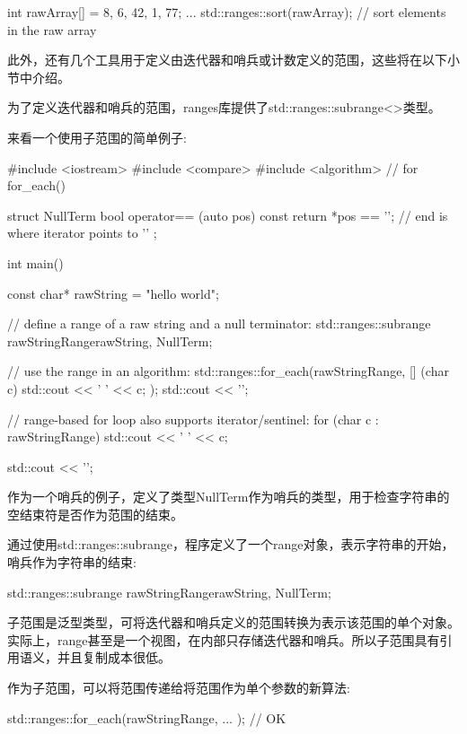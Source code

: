 \begin{cpp}
int rawArray[] = {8, 6, 42, 1, 77};
...
std::ranges::sort(rawArray); // sort elements in the raw array
\end{cpp}

此外，还有几个工具用于定义由迭代器和哨兵或计数定义的范围，这些将在以下小节中介绍。


为了定义迭代器和哨兵的范围，ranges库提供了std::ranges::subrange<>类型。

来看一个使用子范围的简单例子:


\begin{cpp}
#include <iostream>
#include <compare>
#include <algorithm> // for for_each()

struct NullTerm {
	bool operator== (auto pos) const {
		return *pos == '\0'; // end is where iterator points to ’\0’
	}
};

int main()
{
	const char* rawString = "hello world";
	
	// define a range of a raw string and a null terminator:
	std::ranges::subrange rawStringRange{rawString, NullTerm{}};
	
	// use the range in an algorithm:
	std::ranges::for_each(rawStringRange,
	[] (char c) {
		std::cout << ' ' << c;
	});
	std::cout << '\n';
	
	// range-based for loop also supports iterator/sentinel:
	for (char c : rawStringRange) {
		std::cout << ' ' << c;
	}
	
	std::cout << '\n';
}
\end{cpp}

作为一个哨兵的例子，定义了类型NullTerm作为哨兵的类型，用于检查字符串的空结束符是否作为范围的结束。

通过使用std::ranges::subrange，程序定义了一个range对象，表示字符串的开始，哨兵作为字符串的结束:

\begin{cpp}
std::ranges::subrange rawStringRange{rawString, NullTerm{}};
\end{cpp}

子范围是泛型类型，可将迭代器和哨兵定义的范围转换为表示该范围的单个对象。实际上，range甚至是一个视图，在内部只存储迭代器和哨兵。所以子范围具有引用语义，并且复制成本很低。

作为子范围，可以将范围传递给将范围作为单个参数的新算法:

\begin{cpp}
std::ranges::for_each(rawStringRange, ... ); // OK
\end{cpp}

